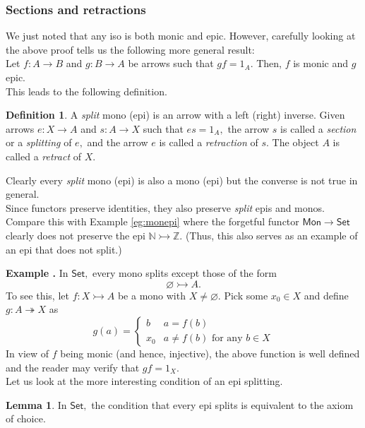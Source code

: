 \documentclass[11pt,leqno,landscape,semhelv]{seminar}
\numberwithin{equation}{section}
\theoremstyle{definition}
\newtheorem{lem}[thm]{Lemma}
\newtheorem{defn}[thm]{Definition}
\numberwithin{thm}{section}
\numberwithin{equation}{section}
\newcommand{\example}[1]{\refstepcounter{thm}\par\medskip
   {\textbf{Example \thethm.} #1} \rmfamily}
\newcommand{\mono}{\rightarrowtail}
\newcommand{\epi}{\twoheadrightarrow}
\let\emptyset\varnothing
\begin{document}
\subsubsection{Sections and retractions}
We just noted that any iso is both monic and epic. However, carefully looking at the above proof tells us the following more general result:\\
Let $f:A\to B$ and $g:B\to A$ be arrows such that $gf = 1_A.$ Then, $f$ is monic and $g$ epic.\\
This leads to the following definition.
\begin{defn} 
	A \emph{split} mono (epi) is an arrow with a left (right) inverse. Given arrows $e:X \to A$ and $s:A \to X$ such that $es = 1_A,$ the arrow $s$ is called a \emph{section} or a \emph{splitting} of $e,$ and the arrow $e$ is called a \emph{retraction} of $s.$ The object $A$ is called a \emph{retract} of $X.$
\end{defn}
Clearly every \emph{split} mono (epi) is also a mono (epi) but the converse is not true in general.\\
Since functors preserve identities, they also preserve \emph{split} epis and monos. Compare this with Example \ref{eg:monepi} where the forgetful functor $\mathsf{Mon}\to \mathsf{Set}$ clearly does not preserve the epi $\mathbb{N}\mono \mathbb{Z}.$ (Thus, this also serves as an example of an epi that does not split.)\\
\example{} In $\mathsf{Set},$ every mono splits except those of the form
\begin{equation*} 
	\emptyset \mono A.
\end{equation*}
To see this, let $f:X \mono A$ be a mono with $X \neq \emptyset.$ Pick some $x_0 \in X$ and define $g:A \epi X$ as
\begin{equation*} 
	g(a) = \begin{cases}
		b & a = f(b)\\
		x_0	& a \neq f(b) \text{ for any } b \in X
	\end{cases}
\end{equation*}	
In view of $f$ being monic (and hence, injective), the above function is well defined and the reader may verify that $gf = 1_X.$\\
Let us look at the more interesting condition of an epi splitting.
\begin{lem} \label{lem:episplit}
	In $\mathsf{Set},$ the condition that every epi splits is equivalent to the axiom of choice.
\end{lem}
\end{document}
